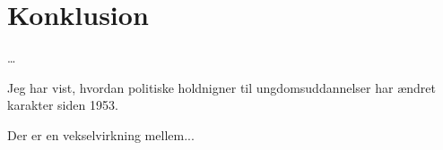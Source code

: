 \part{Konklusion}

\ldots

Jeg har vist, hvordan politiske holdnigner til ungdomsuddannelser har ændret karakter siden 1953.

Der er en vekselvirkning mellem...
